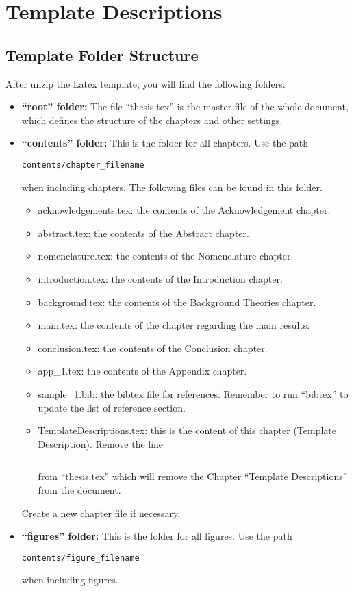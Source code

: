 \section{Template Descriptions}

\subsection{Template Folder Structure}
	After unzip the Latex template, you will find the following folders:
\begin{itemize}
	\item \textbf{``root'' folder:} The file ``thesis.tex'' is the master file of the whole document, which defines the structure of the chapters and other settings.
	\item \textbf{``contents'' folder:}  This is the folder for all chapters. Use the path \begin{verbatim}contents/chapter_filename\end{verbatim} when including chapters. The following files can be found in this folder.
	\begin{itemize}
		\item acknowledgements.tex: the contents of the Acknowledgement chapter. 
		\item abstract.tex: the contents of the Abstract chapter. 
		\item nomenclature.tex: the contents of the Nomenclature chapter. 
		\item introduction.tex: the contents of the Introduction chapter. 
		\item background.tex: the contents of the Background Theories chapter. 
		\item main.tex: the contents of the chapter regarding the main results. 
		\item conclusion.tex: the contents of the Conclusion chapter. 
		\item app\_1.tex: the contents of the Appendix chapter. 
		\item sample\_1.bib: the bibtex file for references. Remember to run ``bibtex'' to update the list of reference section.
		\item TemplateDescriptions.tex: this is the content of this chapter (Template Description). Remove the line \begin{verbatim} \end{verbatim} from ``thesis.tex'' which will remove the Chapter ``Template Descriptions'' from the document.
	\end{itemize}
	Create a new chapter file if necessary.
	\item \textbf{``figures'' folder:} This is the folder for all figures. Use the path \begin{verbatim}contents/figure_filename\end{verbatim} when including figures.
\end{itemize}


